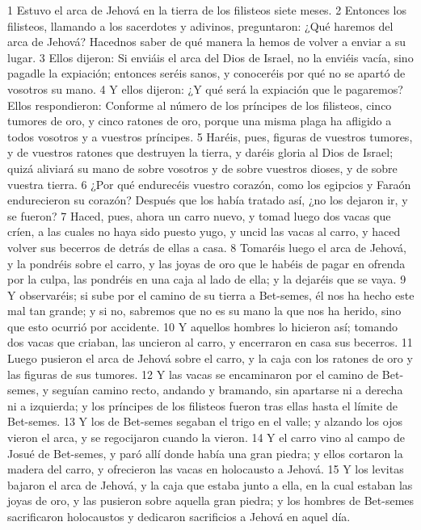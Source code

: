 1 Estuvo el arca de Jehová en la tierra de los filisteos siete meses.
2 Entonces los filisteos, llamando a los sacerdotes y adivinos, preguntaron: ¿Qué haremos del arca de Jehová? Hacednos saber de qué manera la hemos de volver a enviar a su lugar.
3 Ellos dijeron: Si enviáis el arca del Dios de Israel, no la enviéis vacía, sino pagadle la expiación; entonces seréis sanos, y conoceréis por qué no se apartó de vosotros su mano.
4 Y ellos dijeron: ¿Y qué será la expiación que le pagaremos? Ellos respondieron: Conforme al número de los príncipes de los filisteos, cinco tumores de oro, y cinco ratones de oro, porque una misma plaga ha afligido a todos vosotros y a vuestros príncipes.
5 Haréis, pues, figuras de vuestros tumores, y de vuestros ratones que destruyen la tierra, y daréis gloria al Dios de Israel; quizá aliviará su mano de sobre vosotros y de sobre vuestros dioses, y de sobre vuestra tierra.
6 ¿Por qué endurecéis vuestro corazón, como los egipcios y Faraón endurecieron su corazón? Después que los había tratado así, ¿no los dejaron ir, y se fueron?
7 Haced, pues, ahora un carro nuevo, y tomad luego dos vacas que críen, a las cuales no haya sido puesto yugo, y uncid las vacas al carro, y haced volver sus becerros de detrás de ellas a casa.
8 Tomaréis luego el arca de Jehová, y la pondréis sobre el carro, y las joyas de oro que le habéis de pagar en ofrenda por la culpa, las pondréis en una caja al lado de ella; y la dejaréis que se vaya.
9 Y observaréis; si sube por el camino de su tierra a Bet-semes, él nos ha hecho este mal tan grande; y si no, sabremos que no es su mano la que nos ha herido, sino que esto ocurrió por accidente.
10 Y aquellos hombres lo hicieron así; tomando dos vacas que criaban, las uncieron al carro, y encerraron en casa sus becerros.
11 Luego pusieron el arca de Jehová sobre el carro, y la caja con los ratones de oro y las figuras de sus tumores.
12 Y las vacas se encaminaron por el camino de Bet-semes, y seguían camino recto, andando y bramando, sin apartarse ni a derecha ni a izquierda; y los príncipes de los filisteos fueron tras ellas hasta el límite de Bet-semes.
13 Y los de Bet-semes segaban el trigo en el valle; y alzando los ojos vieron el arca, y se regocijaron cuando la vieron.
14 Y el carro vino al campo de Josué de Bet-semes, y paró allí donde había una gran piedra; y ellos cortaron la madera del carro, y ofrecieron las vacas en holocausto a Jehová.
15 Y los levitas bajaron el arca de Jehová, y la caja que estaba junto a ella, en la cual estaban las joyas de oro, y las pusieron sobre aquella gran piedra; y los hombres de Bet-semes sacrificaron holocaustos y dedicaron sacrificios a Jehová en aquel día.
